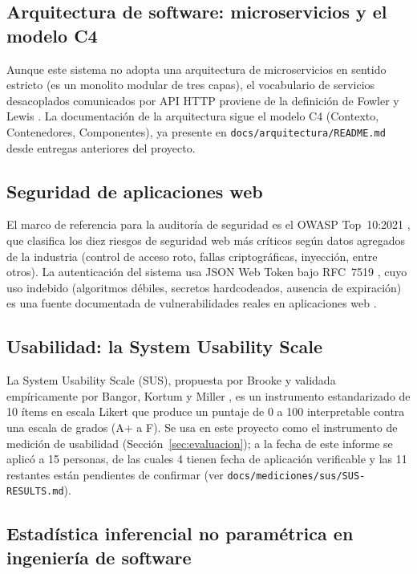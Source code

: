 \subsection{Arquitectura de software: microservicios y el modelo C4}

Aunque este sistema no adopta una arquitectura de microservicios en sentido estricto (es un monolito
modular de tres capas), el vocabulario de servicios desacoplados comunicados por API HTTP proviene de la
definición de Fowler y Lewis \cite{fowler2014}. La documentación de la arquitectura sigue el modelo C4
(Contexto, Contenedores, Componentes), ya presente en \texttt{docs/arquitectura/README.md} desde
entregas anteriores del proyecto.

\subsection{Seguridad de aplicaciones web}

El marco de referencia para la auditoría de seguridad es el OWASP Top~10:2021 \cite{owasp2021}, que
clasifica los diez riesgos de seguridad web más críticos según datos agregados de la industria (control
de acceso roto, fallas criptográficas, inyección, entre otros). La autenticación del sistema usa JSON Web
Token bajo RFC~7519 \cite{jwt2019}, cuyo uso indebido (algoritmos débiles, secretos hardcodeados, ausencia
de expiración) es una fuente documentada de vulnerabilidades reales en aplicaciones web
\cite{lu2018,rezaeinasab2022}.

\subsection{Usabilidad: la System Usability Scale}

La System Usability Scale (SUS), propuesta por Brooke \cite{brooke1996} y validada empíricamente por
Bangor, Kortum y Miller \cite{bangor2008}, es un instrumento estandarizado de 10 ítems en escala Likert
que produce un puntaje de 0 a 100 interpretable contra una escala de grados (A+ a F). Se usa en este
proyecto como el instrumento de medición de usabilidad (Sección~\ref{sec:evaluacion}); a la fecha de este
informe se aplicó a 15 personas, de las cuales 4 tienen fecha de aplicación verificable y las 11
restantes están pendientes de confirmar (ver \texttt{docs/mediciones/sus/SUS-RESULTS.md}).

\subsection{Estadística inferencial no paramétrica en ingeniería de software}


